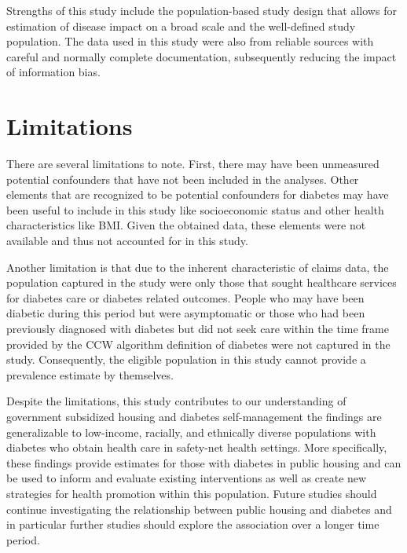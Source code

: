 \documentclass [11pt, proquest] {uwthesis}[2015/03/03]
\begin{document}
Strengths of this study include the population-based study design that
allows for estimation of disease impact on a broad scale and the
well-defined study population. The data used in this study were also
from reliable sources with careful and normally complete documentation,
subsequently reducing the impact of information bias.

\section{Limitations}\label{limitations}

There are several limitations to note. First, there may have been
unmeasured potential confounders that have not been included in the
analyses. Other elements that are recognized to be potential confounders
for diabetes may have been useful to include in this study like
socioeconomic status and other health characteristics like BMI. Given
the obtained data, these elements were not available and thus not
accounted for in this study.

Another limitation is that due to the inherent characteristic of claims
data, the population captured in the study were only those that sought
healthcare services for diabetes care or diabetes related outcomes.
People who may have been diabetic during this period but were
asymptomatic or those who had been previously diagnosed with diabetes
but did not seek care within the time frame provided by the CCW
algorithm definition of diabetes were not captured in the study.
Consequently, the eligible population in this study cannot provide a
prevalence estimate by themselves.

Despite the limitations, this study contributes to our understanding of
government subsidized housing and diabetes self-management the findings
are generalizable to low-income, racially, and ethnically diverse
populations with diabetes who obtain health care in safety-net health
settings. More specifically, these findings provide estimates for those
with diabetes in public housing and can be used to inform and evaluate
existing interventions as well as create new strategies for health
promotion within this population. Future studies should continue
investigating the relationship between public housing and diabetes and
in particular further studies should explore the association over a
longer time period.

\appendix
\end{document}
